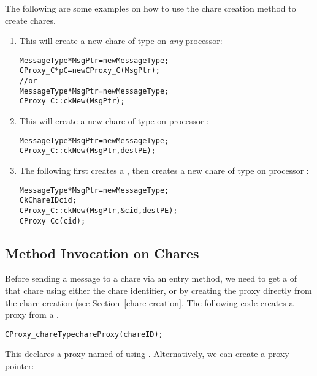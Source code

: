 The following are some examples on how to use the chare creation
method to create chares.

\begin{enumerate}
\item{This will create a new chare of type  on {\em any}
processor:}

\begin{alltt}
   MessageType *MsgPtr = new MessageType;
   CProxy_C *pC = new CProxy_C(MsgPtr);
      // or
   MessageType *MsgPtr = new MessageType;
   CProxy_C::ckNew(MsgPtr);
\end{alltt} 

\item{This will create a new chare of type  on processor
:}

\begin{alltt}
   MessageType *MsgPtr = new MessageType;
   CProxy_C::ckNew(MsgPtr, destPE);
\end{alltt}

\item{The following first creates a  ,
then creates a new chare of type  on processor :}

\begin{alltt}
   MessageType *MsgPtr = new MessageType;
   CkChareID cid;
   CProxy_C::ckNew(MsgPtr, \&cid, destPE);
   CProxy_C c(cid);
\end{alltt}

\end{enumerate}

\subsection{Method Invocation on Chares}

Before sending a message to a chare via an
entry method, we need to get a  of
that chare using either the chare identifier, or by creating the
proxy directly from the chare creation (see Section~\ref{chare
creation}. The following code creates a proxy from a .

\begin{alltt}
   CProxy_chareType chareProxy(chareID);
\end{alltt}

This declares a proxy named  of  
using .  Alternatively, we can create a proxy pointer:

